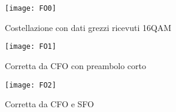 \begin{itemize}
\begin{figure}[h]
	\centering
	\begin{minipage}[b]{.30\columnwidth}
		\texttt{[image: FO0]}
		\caption{Costellazione con dati grezzi ricevuti 16QAM}\label{fig:1}
	\end{minipage}\hfill
	\begin{minipage}[b]{.30\columnwidth}
		\texttt{[image: FO1]}
		\caption{Corretta da CFO con preambolo corto}\label{fig:1}
	\end{minipage}\hfill
	\begin{minipage}[b]{.30\columnwidth}
		\texttt{[image: FO2]}
		\caption{Corretta da CFO e SFO}\label{fig:1}
	\end{minipage}\hfill
	\cite{FOOFDM}
	\end{figure}
	
	
\label{sec:problem}

\end{itemize}
